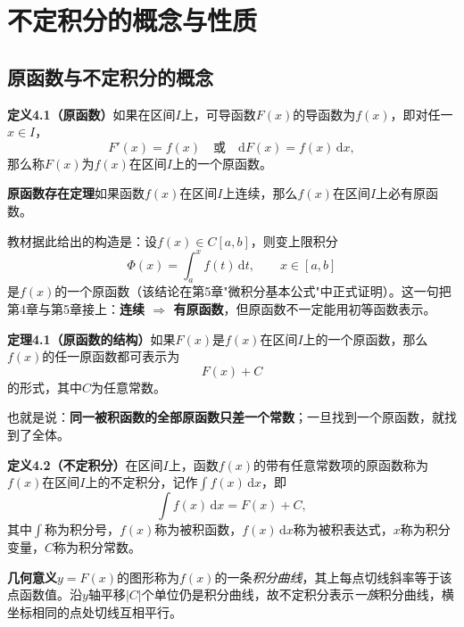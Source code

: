 
\section{不定积分的概念与性质}

\subsection{原函数与不定积分的概念}

\noindent\textbf{定义4.1（原函数）}\quad 如果在区间$I$上，可导函数$F(x)$的导函数为$f(x)$，即对任一$x\in I$，
\[
F'(x)=f(x)\quad\text{或}\quad \mathrm{d}F(x)=f(x)\,\mathrm{d}x,
\]
那么称$F(x)$为$f(x)$在区间$I$上的一个原函数。

\noindent\textbf{原函数存在定理}\quad 如果函数$f(x)$在区间$I$上连续，那么$f(x)$在区间$I$上必有原函数。

\noindent 教材据此给出的构造是：设$f(x)\in C[a,b]$，则变上限积分
\[
\Phi(x)=\int_a^x f(t)\,\mathrm{d}t,\qquad x\in[a,b]
\]
是$f(x)$的一个原函数（该结论在第5章"微积分基本公式"中正式证明）。这一句把第4章与第5章接上：\textbf{连续 $\Rightarrow$ 有原函数}，但原函数不一定能用初等函数表示。

\noindent\textbf{定理4.1（原函数的结构）}\quad 如果$F(x)$是$f(x)$在区间$I$上的一个原函数，那么$f(x)$的任一原函数都可表示为
\[
F(x)+C
\]
的形式，其中$C$为任意常数。

\noindent 也就是说：\textbf{同一被积函数的全部原函数只差一个常数}；一旦找到一个原函数，就找到了全体。

\noindent\textbf{定义4.2（不定积分）}\quad 在区间$I$上，函数$f(x)$的带有任意常数项的原函数称为$f(x)$在区间$I$上的不定积分，记作$\displaystyle\int f(x)\,\mathrm{d}x$，即
\[
\int f(x)\,\mathrm{d}x=F(x)+C,
\]
其中$\int$称为积分号，$f(x)$称为被积函数，$f(x)\,\mathrm{d}x$称为被积表达式，$x$称为积分变量，$C$称为积分常数。

\noindent\textbf{几何意义}\quad $y=F(x)$的图形称为$f(x)$的一条\emph{积分曲线}，其上每点切线斜率等于该点函数值。沿$y$轴平移$|C|$个单位仍是积分曲线，故不定积分表示\emph{一族}积分曲线，横坐标相同的点处切线互相平行。

